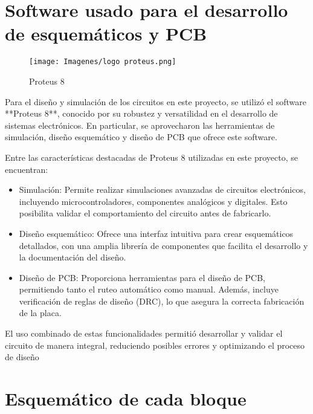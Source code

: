      
    
\section{Software usado para el desarrollo de esquemáticos y PCB}

\begin{figure}[h]
    \centering
    \texttt{[image: Imagenes/logo proteus.png]}
    \caption{Proteus 8}
    \label{fig:logo_proteus}
\end{figure}

Para el diseño y simulación de los circuitos en este proyecto, se utilizó el software **Proteus 8**, conocido por su robustez y versatilidad en el desarrollo de sistemas electrónicos. En particular, se aprovecharon las herramientas de simulación, diseño esquemático y diseño de PCB que ofrece este software.

Entre las características destacadas de Proteus 8 utilizadas en este proyecto, se encuentran:

\begin{itemize}
    \item Simulación: %
    Permite realizar simulaciones avanzadas de circuitos electrónicos, incluyendo microcontroladores, componentes analógicos y digitales. Esto posibilita validar el comportamiento del circuito antes de fabricarlo.
    \item Diseño esquemático: %
    Ofrece una interfaz intuitiva para crear esquemáticos detallados, con una amplia librería de componentes que facilita el desarrollo y la documentación del diseño.
    \item Diseño de PCB: %
    Proporciona herramientas para el diseño de PCB, permitiendo tanto el ruteo automático como manual. Además, incluye verificación de reglas de diseño (DRC), lo que asegura la correcta fabricación de la placa.
\end{itemize}

El uso combinado de estas funcionalidades permitió desarrollar y validar el circuito de manera integral, reduciendo posibles errores y optimizando el proceso de diseño

\section{Esquemático de cada bloque}

